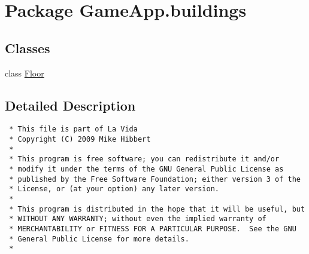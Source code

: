 \hypertarget{namespaceGameApp_1_1buildings}{
\section{Package GameApp.buildings}
\label{namespaceGameApp_1_1buildings}
}


\subsection*{Classes}
\begin{CompactItemize}
\item 
class \hyperlink{classGameApp_1_1buildings_1_1Floor}{Floor}
\end{CompactItemize}


\subsection{Detailed Description}


\footnotesize\begin{verbatim}
 * This file is part of La Vida
 * Copyright (C) 2009 Mike Hibbert
 *
 * This program is free software; you can redistribute it and/or
 * modify it under the terms of the GNU General Public License as
 * published by the Free Software Foundation; either version 3 of the
 * License, or (at your option) any later version.
 *
 * This program is distributed in the hope that it will be useful, but
 * WITHOUT ANY WARRANTY; without even the implied warranty of
 * MERCHANTABILITY or FITNESS FOR A PARTICULAR PURPOSE.  See the GNU
 * General Public License for more details.
 *
\end{verbatim}
\normalsize
 